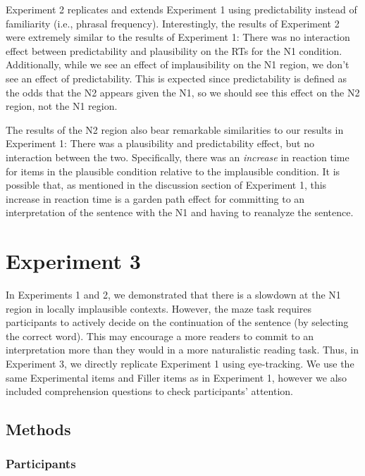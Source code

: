 \documentclass[
  12pt,
  letterpaper,
]{scrreport}
\begin{document}
Experiment 2 replicates and extends Experiment 1 using predictability
instead of familiarity (i.e., phrasal frequency). Interestingly, the
results of Experiment 2 were extremely similar to the results of
Experiment 1: There was no interaction effect between predictability and
plausibility on the RTs for the N1 condition. Additionally, while we see
an effect of implausibility on the N1 region, we don't see an effect of
predictability. This is expected since predictability is defined as the
odds that the N2 appears given the N1, so we should see this effect on
the N2 region, not the N1 region.

The results of the N2 region also bear remarkable similarities to our
results in Experiment 1: There was a plausibility and predictability
effect, but no interaction between the two. Specifically, there was an
\emph{increase} in reaction time for items in the plausible condition
relative to the implausible condition. It is possible that, as mentioned
in the discussion section of Experiment 1, this increase in reaction
time is a garden path effect for committing to an interpretation of the
sentence with the N1 and having to reanalyze the sentence.

\section{Experiment 3}\label{experiment-3}

In Experiments 1 and 2, we demonstrated that there is a slowdown at the
N1 region in locally implausible contexts. However, the maze task
requires participants to actively decide on the continuation of the
sentence (by selecting the correct word). This may encourage a more
readers to commit to an interpretation more than they would in a more
naturalistic reading task. Thus, in Experiment 3, we directly replicate
Experiment 1 using eye-tracking. We use the same Experimental items and
Filler items as in Experiment 1, however we also included comprehension
questions to check participants' attention.

\subsection{Methods}\label{methods-2}

\subsubsection{Participants}\label{participants-2}
\end{document}
